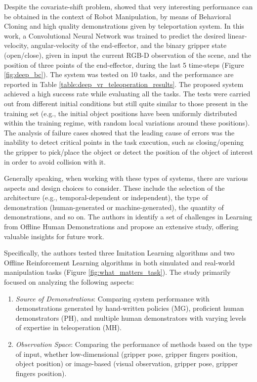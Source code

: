 Despite the covariate-shift problem, \cite{zhang2018deep_vr_teleoperation} showed that very interesting performance can be obtained in the context of Robot Manipulation, by means of Behavioral Cloning and high quality demonstrations given by teleportation system. In this work, a Convolutional Neural Network was trained to predict the desired linear-velocity, angular-velocity of the end-effector, and the binary gripper state (open/close), given in input the current RGB-D observation of the scene, and the position of three points of the end-effector, during the last 5 time-steps (Figure \ref{fig:deep_bc}). The system was tested on 10 tasks, and the performance are reported in Table \ref{table:deep_vr_teleoperation_results}. The proposed system achieved a high success rate while evaluating all the tasks. The tests were carried out from different initial conditions but still quite similar to those present in the training set (e.g., the initial object positions have been uniformly distributed within the training regime, with random local variations around these positions). The analysis of failure cases showed that the leading cause of errors was the inability to detect critical points in the task execution, such as closing/opening the gripper to pick/place the object or detect the position of the object of interest in order to avoid collision with it.


Generally speaking, when working with these types of systems, there are various aspects and design choices to consider. These include the selection of the architecture (e.g., temporal-dependent or independent), the type of demonstration (human-generated or machine-generated), the quantity of demonstrations, and so on. The authors in \cite{mandlekar2022matters} identify a set of challenges in Learning from Offline Human Demonstrations and propose an extensive study, offering valuable insights for future work.

Specifically, the authors tested three Imitation Learning algorithms and two Offline Reinforcement Learning algorithms in both simulated and real-world manipulation tasks (Figure \ref{fig:what_matters_task}). The study primarily focused on analyzing the following aspects:

\begin{enumerate}
    \item \textit{Source of Demonstrations}: Comparing system performance with demonstrations generated by hand-written policies (MG), proficient human demonstrators (PH), and multiple human demonstrators with varying levels of expertise in teleoperation (MH).
    \item \textit{Observation Space}: Comparing the performance of methods based on the type of input, whether low-dimensional (gripper pose, gripper fingers position, object position) or image-based (visual observation, gripper pose, gripper fingers position).
\end{enumerate}


